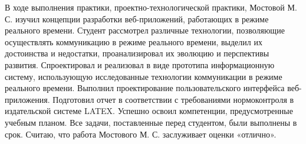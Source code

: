 В ходе выполнения практики, проектно-технологической практики, Мостовой М. С. изучил концепции разработки веб-приложений, работающих в режиме реального времени. Студент рассмотрел различные технологии, позволяющие осуществлять коммуникацию в режиме реального времени, выделил их достоинства и недостатки, проанализировал их эволюцию и перспективы развития. Спроектировал и реализовал в виде прототипа информационную систему, использующую исследованные технологии коммуникации в режиме реального времени. Выполнил проектирование пользовательского интерфейса веб-приложения. Подготовил отчет в соответствии с требованиями нормоконтроля в издательской системе LATEX. Успешно освоил компетенции, предусмотренные учебным планом. Все задачи, поставленные перед студентом, были выполнены в срок. Считаю, что работа Мостового М. С. заслуживает оценки «отлично».

\progressapprov
